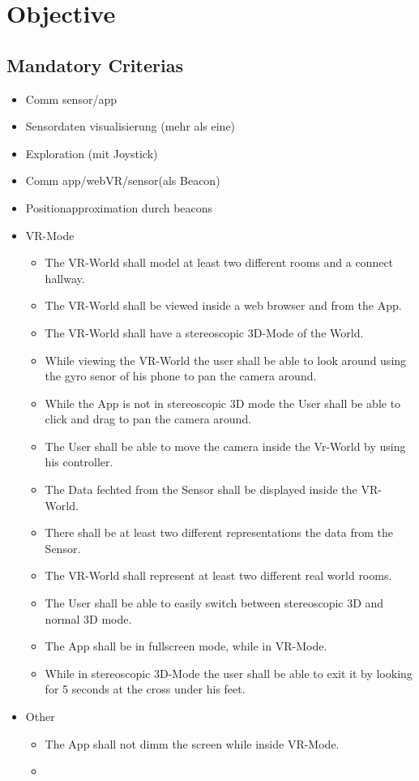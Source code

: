 \section{Objective}


\textbf{}

\subsection{Mandatory Criterias}

\begin{itemize}
  \item Comm sensor/app
  \item Sensordaten visualisierung (mehr als eine)
  \item Exploration (mit Joystick)
  \item Comm app/webVR/sensor(als Beacon)
  \item Positionapproximation durch beacons

  \item VR-Mode
  \begin{itemize}
    \item The VR-World shall model at least two different rooms and a connect hallway.
    \item The VR-World shall be viewed inside a web browser and from the App.
    \item The VR-World shall have a stereoscopic 3D-Mode of the World.
    \item While viewing the VR-World the user shall be able to look around using the gyro senor of his phone to pan the camera around.
    \item While the App is not in stereoscopic 3D mode the User shall be able to click and drag to pan the camera around.
    \item The User shall be able to move the camera inside the Vr-World by using his controller.
    \item The Data fechted from the Sensor shall be displayed inside the VR-World.
    \item There shall be at least two different representations the data from the Sensor.
    \item The VR-World shall represent at least two different real world rooms.
    \item The User shall be able to easily switch between stereoscopic 3D and normal 3D mode.
    \item The App shall be in fullscreen mode, while in VR-Mode.
    \item While in stereoscopic 3D-Mode the user shall be able to exit it by looking for 5 seconds at the cross under his feet.
  \end{itemize}
  \item Other
  \begin{itemize}
    \item The App shall not dimm the screen while inside VR-Mode.
    \item
  \end{itemize}
\end{itemize}

